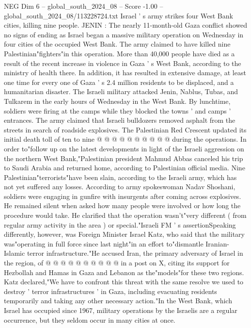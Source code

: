 \begin{textsample}{NEG Dim 6 – global\_south\_2024\_08 – Score -1.00 – global\_south\_2024\_08/113228724.txt}  \label{ex:f6_neg_058}
Israel ' s army strikes four West Bank cities, killing nine people.
JENIN : The nearly 11-month-old Gaza conflict showed no signs of ending as Israel began a massive military operation on Wednesday in four cities of the occupied West Bank.
The army claimed to have killed nine Palestinian"fighters"in this operation.
More than 40,000 people have died as a result of the recent increase in violence in Gaza ' s West Bank, according to the ministry of health there.
In addition, it has resulted in extensive damage, at least one time for every one of Gaza ' s 2.4 million residents to be displaced, and a humanitarian disaster.
The Israeli military attacked Jenin, Nablus, Tubas, and Tulkarem in the early hours of Wednesday in the West Bank.
By lunchtime, soldiers were firing at the camps while they blocked the towns ' and camps ' entrances.
The army claimed that Israeli bulldozers removed asphalt from the streets in search of roadside explosives.
The Palestinian Red Crescent updated its initial death toll of ten to nine @ @ @ @ @ @ @ @ @ @ during the operations.
In order to"follow up on the latest developments in light of the Israeli aggression on the northern West Bank,"Palestinian president Mahmud Abbas canceled his trip to Saudi Arabia and returned home, according to Palestinian official media.
Nine Palestinian"terrorists"have been slain, according to the Israeli army, which has not yet suffered any losses.
According to army spokeswoman Nadav Shoshani, soldiers were engaging in gunfire with insurgents after coming across explosives.
He remained silent when asked how many people were involved or how long the procedure would take.
He clarified that the operation wasn't"very different ( from regular army activity in the area ) or special."Israeli FM ' s assertionSpeaking differently, however, was Foreign Minister Israel Katz, who said that the military was"operating in full force since last night"in an effort to"dismantle Iranian-Islamic terror infrastructure."He accused Iran, the primary adversary of Israel in the region, of @ @ @ @ @ @ @ @ @ @ in a post on X, citing its support for Hezbollah and Hamas in Gaza and Lebanon as the"models"for these two regions.
Katz declared,"We have to confront this threat with the same resolve we used to destroy ' terror infrastructures ' in Gaza, including evacuating residents temporarily and taking any other necessary action."In the West Bank, which Israel has occupied since 1967, military operations by the Israelis are a regular occurrence, but they seldom occur in many cities at once.

\end{textsample}
